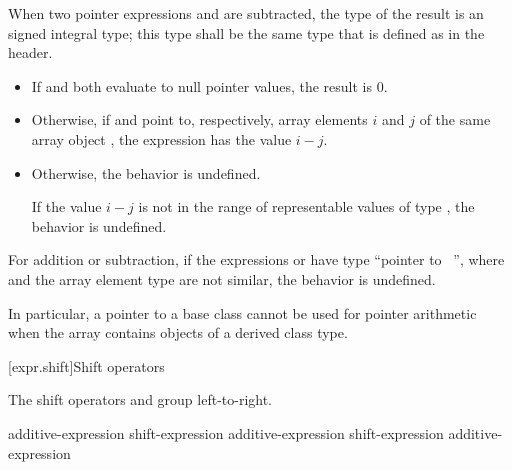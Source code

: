 \pnum
{}%
%
%
%
When two pointer expressions  and  are subtracted,
the type of the result is an  signed
integral type; this type shall be the same type that is defined as
 in the 
header.
\begin{itemize}
\item If  and  both evaluate to null pointer values,
the result is 0.
\item Otherwise, if  and  point to, respectively,
array elements $i$ and $j$
of the same array object ,
the expression  has the value $i - j$.
\item Otherwise, the behavior is undefined.
\begin{note}
If the value $i - j$
is not in the range of representable values
of type ,
the behavior is undefined.
\end{note}
\end{itemize}

\pnum
For addition or subtraction, if the expressions  or  have
type ``pointer to \cv{}~'', where  and the array element type
are not similar, the behavior is undefined.
\begin{note}
In particular, a pointer to a base class cannot be used for
pointer arithmetic when the array contains objects of a derived class type.
\end{note}

[expr.shift]{Shift operators}

\pnum
{}%
%
%
%
%
%
The shift operators \tcode{<<} and \tcode{>>} group left-to-right.

%
%
%
%
%
\begin{bnf}
\br
    additive-expression\br
    shift-expression \terminal{<<} additive-expression\br
    shift-expression \terminal{>>} additive-expression
\end{bnf}

